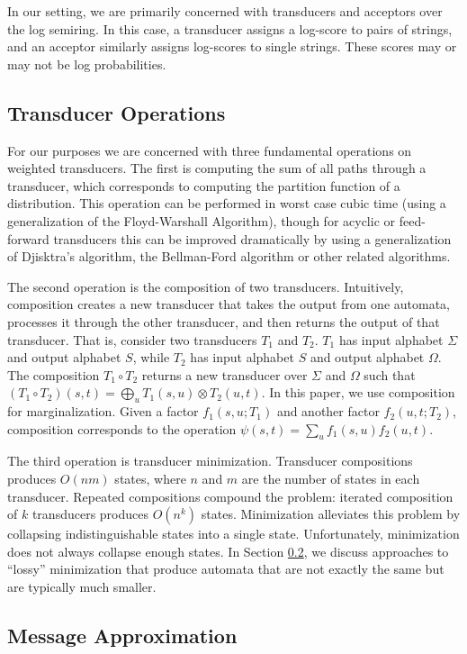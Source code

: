 \documentclass[11pt,a4paper]{article}
\begin{document}
In our setting, we are primarily concerned with transducers and
acceptors over the log semiring. In this case, a transducer assigns
a log-score to pairs of strings, and an acceptor similarly assigns
log-scores to single strings. These scores may or may not be
log probabilities.

\subsection{Transducer Operations}

For our purposes we are concerned with three fundamental operations
on weighted transducers. The first is computing the sum of all paths through a
transducer, which corresponds to computing the partition function
of a distribution. This operation can be performed in worst case
cubic time (using a generalization of the Floyd-Warshall Algorithm),
though for acyclic or feed-forward transducers this can be improved
dramatically by using a generalization of Djisktra's algorithm, the
Bellman-Ford algorithm or other related algorithms.

The second operation is the composition of two transducers. Intuitively,
composition creates a new transducer that takes the output from one
automata, processes it through the other transducer, and then returns
the output of that transducer. That is, consider two transducers
$T_1$ and $T_2$. $T_1$ has input alphabet $\Sigma$ and output
alphabet $S$, while $T_2$ has input alphabet $S$ and
output alphabet $\Omega$. The composition $T_1 \circ T_2$ returns
a new transducer over $\Sigma$ and $\Omega$ such that $(T_1 \circ
T_2)(s,t) = \bigoplus_{u} T_1(s,u)\otimes T_2(u,t)$. In this paper,
we use composition for marginalization. Given a factor $f_1(s,u;T_1)$
and another factor $f_2(u,t;T_2)$, composition corresponds to the
operation $\psi(s,t) = \sum_u f_1(s,u) f_2(u,t)$.

The third operation is transducer minimization. Transducer compositions
produces $O(nm)$ states, where $n$ and $m$ are the number of states
in each transducer. Repeated compositions compound the problem:
iterated composition of $k$ transducers produces $O(n^k)$ states.
Minimization alleviates this problem by collapsing indistinguishable
states into a single state. Unfortunately, minimization does not
always collapse enough states. In Section \ref{sec:approx}, we discuss approaches
to ``lossy'' minimization that produce automata that are not exactly
the same but are typically much smaller.

\subsection{Message Approximation}
\label{sec:approx}
\end{document}

